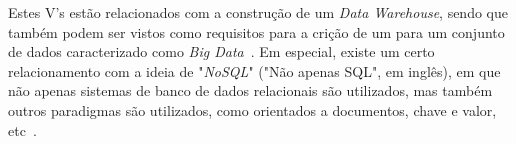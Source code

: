Estes V's estão relacionados com a construção de um \textit{Data Warehouse}, sendo que também podem ser vistos como requisitos para a crição de um para um conjunto de dados caracterizado como \textit{Big Data}~\cite{zhangBigDataFramework2017}.
Em especial, existe um certo relacionamento com a ideia de "\textit{NoSQL}" ("Não apenas SQL", em inglês), em que não apenas sistemas de banco de dados relacionais são utilizados, mas também outros paradigmas são utilizados, como orientados a documentos, chave e valor, etc~\cite{bimonteOpenIssuesBig2016}.


